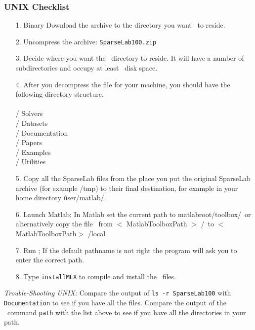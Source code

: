 \documentclass{article}
\begin{document}
\subsubsection{UNIX Checklist}
\begin{enumerate}
\item[1.] Binary Download the archive to the directory you want
\WaveLab\ to reside.
\item[2.] Uncompress the archive: {\tt SparseLab100.zip}
\item[3.] Decide where you want the \WaveLab\ directory to reside. It will have
a number of subdirectories and occupy at least \MinSize\ disk space.
\item[4.] After you decompress the file for your machine, you should
have the following directory structure.\\
\WLName \\
\WLName / Solvers\\
\WLName / Datasets \\
\WLName / Documentation\\
\WLName / Papers\\
\WLName / Examples\\
\WLName / Utilities \\
\item[5.] Copy all the SparseLab files from the place you put the original SparseLab
 archive (for example /tmp) to their final destination, for example in your home
 directory
    \~ user/matlab/\WLName.

\item[6.] Launch Matlab; In Matlab set the current path to
matlabroot/toolbox/\WLName\ or alternatively copy the file
\WavePath\ from $<$ MatlabToolboxPath $>$ /\WLName\ to
$<$MatlabToolboxPath$>$ /local

\item[7.] Run \WavePath; If the default pathname is not right the
program will ask you to enter the correct path.
\item[8.] Type {\tt installMEX} to compile and install the \dotmex\ files.
\end{enumerate}

{\it Trouble-Shooting UNIX:} Compare the output of {\tt ls -r
SparseLab100} with {\tt Documentation}  to see if you have all the
files. Compare the output of the \Matlab\ command {\tt path} with
the list above to see if you have all the directories in your path.
\end{document}
